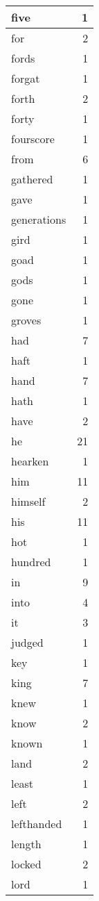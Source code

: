 \begin{center}
\begin{longtable}{l|r}
five & 1 \\ \hline
for & 2 \\ \hline
fords & 1 \\ \hline
forgat & 1 \\ \hline
forth & 2 \\ \hline
forty & 1 \\ \hline
fourscore & 1 \\ \hline
from & 6 \\ \hline
gathered & 1 \\ \hline
gave & 1 \\ \hline
generations & 1 \\ \hline
gird & 1 \\ \hline
goad & 1 \\ \hline
gods & 1 \\ \hline
gone & 1 \\ \hline
groves & 1 \\ \hline
had & 7 \\ \hline
haft & 1 \\ \hline
hand & 7 \\ \hline
hath & 1 \\ \hline
have & 2 \\ \hline
he & 21 \\ \hline
hearken & 1 \\ \hline
him & 11 \\ \hline
himself & 2 \\ \hline
his & 11 \\ \hline
hot & 1 \\ \hline
hundred & 1 \\ \hline
in & 9 \\ \hline
into & 4 \\ \hline
it & 3 \\ \hline
judged & 1 \\ \hline
key & 1 \\ \hline
king & 7 \\ \hline
knew & 1 \\ \hline
know & 2 \\ \hline
known & 1 \\ \hline
land & 2 \\ \hline
least & 1 \\ \hline
left & 2 \\ \hline
lefthanded & 1 \\ \hline
length & 1 \\ \hline
locked & 2 \\ \hline
lord & 1 \\ \hline

\end{longtable}
\end{center}
